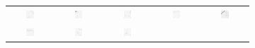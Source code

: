 \begin{figure}
\begin{subfigure}{0.45\textwidth}
\begin{tabular}{c@{\,}c@{\,}c@{\,}c@{\,}c@{}}
			\includegraphics[width=0.19\textwidth]{fig01c06} &
			\includegraphics[width=0.19\textwidth]{fig01c07} &
			\includegraphics[width=0.19\textwidth]{fig01c08} &
			\includegraphics[width=0.19\textwidth]{fig01c09} &
			\includegraphics[width=0.19\textwidth]{fig01c10} \\
			\includegraphics[width=0.19\textwidth]{fig01c11} &
			\includegraphics[width=0.19\textwidth]{fig01c12} &
			\includegraphics[width=0.19\textwidth]{fig01c13} &

\end{tabular}
\end{subfigure}
\end{figure}
